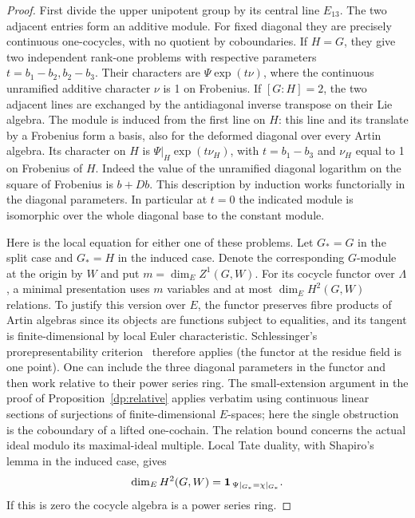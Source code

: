 \begin{proof}
First divide the upper unipotent group by its central line \(E_{13}\).
The two adjacent entries form an additive module. For fixed diagonal
they are precisely continuous one-cocycles, with no quotient by
coboundaries. If \(H=G\), they give two independent rank-one
problems with respective parameters \(t=b_1-b_2,b_2-b_3\).
Their characters are \(\Psi\exp(t\nu)\), where the continuous
unramified additive character \(\nu\) is 1 on Frobenius.
If \([G:H]=2\), the two adjacent lines are exchanged by the
antidiagonal inverse transpose on their Lie algebra. The module
is induced from the first line on \(H\): this line and its translate
by a Frobenius form a basis, also for the deformed diagonal over
every Artin algebra. Its character on \(H\) is
\(\Psi|_H\exp(t\nu_H)\), with \(t=b_1-b_3\) and \(\nu_H\) equal
to 1 on Frobenius of \(H\). Indeed the value of the unramified
diagonal logarithm on the square of Frobenius is \(b+Db\).
This description by induction works functorially in the diagonal
parameters. In particular at \(t=0\) the indicated module is
isomorphic over the whole diagonal base to the constant module.

Here is the local equation for either one of these problems. Let
\(G_*=G\) in the split case and \(G_*=H\) in the induced case.
Denote the corresponding \(G\)-module at the origin by \(W\) and
put \(m=\dim_E Z^1(G,W)\). For its cocycle functor over \(\Lambda\),
a minimal presentation uses \(m\) variables and at most
\(\dim_E H^2(G,W)\) relations. To justify this version over \(E\),
the functor preserves fibre products of Artin algebras since its
objects are functions subject to equalities, and its tangent is
finite-dimensional by local Euler characteristic. Schlessinger's
prorepresentability criterion~\cite[Theorem 2.11]{schlessingerArtin}
therefore applies (the functor at the residue field is
one point). One can include the three diagonal
parameters in the functor and then work relative to their power
series ring. The small-extension argument in the proof of
Proposition~\ref{dp:relative} applies verbatim using continuous
linear sections of surjections of finite-dimensional \(E\)-spaces;
here the single obstruction is the coboundary of a lifted one-cochain.
The relation bound concerns the actual ideal modulo its maximal-ideal
multiple. Local Tate duality, with Shapiro's lemma in the induced
case, gives
\[
 \dim_E H^2(G,W)=
 {\bf1}_{\,\Psi|_{G_*}=\chi|_{G_*}} .
\]
If this is zero the cocycle algebra is a power series ring.


\end{proof}
